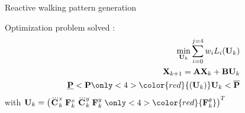\begin{frame}{Reactive walking pattern generation }
  \begin{minipage}{0.48\textwidth}
    Optimization problem solved :
    \vspace*{-0.3cm}
    \begin{equation*}
      \begin{aligned}
        \min_{{\bf U}_k} 
        \sum_{i=0}^{j=4} w_i L_i({\bf U}_{k}) & \\
        {\bf X}_{k+1} = {\bf A}{\bf X}_{k} + {\bf B} {\bf U}_k & \\
        \underline{\bf P} < {\bf P}\only<4>{{\color{red}{({\bf U}_k)}}} {\bf U}_k  < \overline{\bf P}& \\
      \end{aligned}
    \end{equation*}
    with ${\bf U}_k=\begin{pmatrix} \dddot{\bf C}^x_k \; {\bf F}^x_k\; \dddot{\bf C}^y_k \;{\bf F}^y_k \;\only<4>{\color{red}{{\bf F}^{\theta}_k}}\end{pmatrix}^T$ \\
  \end{minipage}
  \begin{minipage}{0.48\textwidth}
  \end{minipage}\\


\end{frame}
